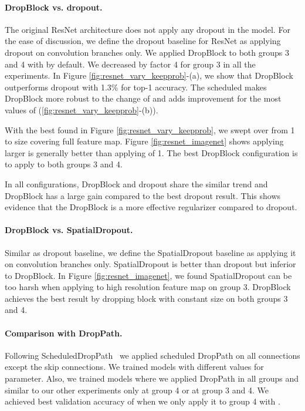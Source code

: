 \documentclass{article}
\begin{document}
\paragraph{DropBlock vs. dropout.}
The original ResNet architecture does not apply any dropout in the model. For the ease of discussion, we define the dropout baseline for ResNet as applying dropout on convolution branches only. We applied DropBlock to both groups 3 and 4 with  by default. We decreased  by factor 4 for group 3 in all the experiments. In Figure \ref{fig:resnet_vary_keepprob}-(a), we show that DropBlock outperforms dropout with 1.3\% for top-1 accuracy.
The scheduled  makes DropBlock more robust to the change of  and adds improvement for the most values of  (\ref{fig:resnet_vary_keepprob}-(b)).

With the best  found in Figure \ref{fig:resnet_vary_keepprob}, we swept over  from 1 to size covering full feature map. Figure \ref{fig:resnet_imagenet} shows applying larger  is generally better than applying  of 1. The best DropBlock configuration is to apply  to both groups 3 and 4.

In all configurations, DropBlock and dropout share the similar trend and DropBlock has a large gain compared to the best dropout result. This shows evidence that the DropBlock is a more effective regularizer compared to dropout. 

\paragraph{DropBlock vs. SpatialDropout.}
Similar as dropout baseline, we define the SpatialDropout \cite{tompson2015spatialdropout} baseline as applying it on convolution branches only. SpatialDropout is better than dropout but inferior to DropBlock. In Figure \ref{fig:resnet_imagenet}, we found SpatialDropout can be too harsh when applying to high resolution feature map on group 3. DropBlock achieves the best result by dropping block with constant size on both groups 3 and 4.

\paragraph{Comparison with DropPath.}
Following ScheduledDropPath~\cite{zoph2017learning} we applied scheduled DropPath on all  connections except the skip connections. We trained models with different values for  parameter. Also, we trained models where we applied DropPath in all groups and similar to our other experiments only at group 4 or at group 3 and 4. We achieved best validation accuracy of  when we only apply it to group 4 with .
\end{document}
